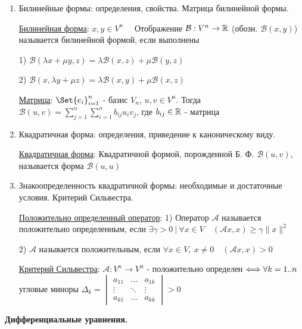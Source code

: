 \documentclass[12pt]{article}
\begin{document}
\begin{enumerate}
        \item Билинейные формы: определения, свойства. Матрица билинейной формы.

        \hyperlink{bilinearforms}{Билинейная форма}: $x, y \in V^n \quad$ Отображение $\mathcal{B}: V^n \to \mathbb{R}$ (обозн. $\mathcal{B}(x, y)$)
        называется билинейной формой, если выполнены

        1) $\mathcal{B}(\lambda x + \mu y, z) = \lambda \mathcal{B}(x, z) + \mu \mathcal{B}(y, z)$

        2) $\mathcal{B}(x, \lambda y + \mu z) = \lambda \mathcal{B}(x, y) + \mu \mathcal{B}(x, z)$

        \hyperlink{bilinearformmatrix}{Матрица}: $\Set{e_i}_{i=1}^n$ - базис $V_n$, $u, v \in V^n$. Тогда $\mathcal{B}(u, v) =
        \sum_{j = 1}^{n}\sum_{i = 1}^{n} b_{ij} u_i v_j$, где $b_{ij} \in \mathbb{R}$ - матрица


        \item Квадратичная форма: определения, приведение к каноническому виду.

        \hyperlink{quadraticform}{Квадратичная форма}: Квадратичной формой, порожденной Б. Ф. $\mathcal{B}(u, v)$, называется форма $\mathcal{B}(u, u)$


        \item Знакоопределенность квадратичной формы: необходимые и достаточные условия. Критерий Сильвестра.

        \hyperlink{positivedefinedoperator}{Положительно определенный оператор}: 1) Оператор $\mathcal{A}$ называется положительно определенным, если
        $\exists \gamma > 0 \ | \ \forall x \in V \quad (\mathcal{A}x, x) \geq \gamma \|x\|^2$

        2) $\mathcal{A}$ называется положительным, если
        $\forall x \in V, \ x \neq 0 \quad (\mathcal{A}x, x) > 0$


        \hyperlink{criterionSilvester}{Критерий Сильвестра}: $\mathcal{A}: V^n \to V^n$ - положительно определен $\Longleftrightarrow \\ \forall k = 1..n $ угловые миноры $ \Delta_k =
        \begin{vmatrix}a_{11} & \dots & a_{1k} \\ \vdots & \ddots & \vdots \\ a_{k1} & \dots & a_{kk}\end{vmatrix} > 0$


    \end{enumerate}

    \begin{center}
        \textbf{Дифференциальные уравнения.}
    \end{center}
\end{document}
